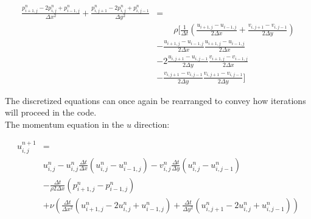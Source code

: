 \documentclass{article}
\begin{document}
\begin{equation}
	\begin{aligned}
		\frac{p_{i+1,j}^{n}-2p_{i,j}^{n}+p_{i-1,j}^{n}}{\Delta
		x^2}+\frac{p_{i,j+1}^{n}-2p_{i,j}^{n}+p_{i,j-1}^{n}}{\Delta y^2} & =                                     \\
		                                                                 & \qquad \rho \biggr[ \frac{1}{\Delta
			t}\left(\frac{u_{i+1,j}-u_{i-1,j}}{2\Delta
		x}+\frac{v_{i,j+1}-v_{i,j-1}}{2\Delta y}\right)                                                          \\
		                                                                 & -\frac{u_{i+1,j}-u_{i-1,j}}{2\Delta
		x}\frac{u_{i+1,j}-u_{i-1,j}}{2\Delta x}                                                                  \\
		                                                                 & - 2\frac{u_{i,j+1}-u_{i,j-1}}{2\Delta
		y}\frac{v_{i+1,j}-v_{i-1,j}}{2\Delta x}                                                                  \\
		                                                                 & - \frac{v_{i,j+1}-v_{i,j-1}}{2\Delta
		y}\frac{v_{i,j+1}-v_{i,j-1}}{2\Delta y} \biggr]
	\end{aligned}
\end{equation}

\noindent The discretized equations can once again be rearranged to convey
how iterations will proceed in the code.\\

\noindent  The momentum equation in the $u$ direction:

\begin{equation}
	\begin{aligned}
		u_{i,j}^{n+1} & =                                                   \\
		              & u_{i,j}^{n} - u_{i,j}^{n} \frac{\Delta t}{\Delta x}
		\left(u_{i,j}^{n}-u_{i-1,j}^{n}\right) - v_{i,j}^{n} \frac{\Delta t}{\Delta y}
		\left(u_{i,j}^{n}-u_{i,j-1}^{n}\right)                              \\
		              & - \frac{\Delta t}{\rho 2\Delta x}
		\left(p_{i+1,j}^{n}-p_{i-1,j}^{n}\right)                            \\
		              & + \nu \left(\frac{\Delta t}{\Delta x^2}
		\left(u_{i+1,j}^{n}-2u_{i,j}^{n}+u_{i-1,j}^{n}\right) + \frac{\Delta t}{\Delta
				y^2} \left(u_{i,j+1}^{n}-2u_{i,j}^{n}+u_{i,j-1}^{n}\right)\right)
	\end{aligned}
\end{equation}
\end{document}
